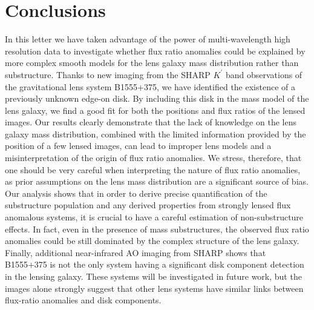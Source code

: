 \documentclass[useAMS,usenatbib]{mn2e}
\begin{document}
\section{Conclusions}
In this letter we have taken advantage of the power of
multi-wavelength high resolution data to investigate whether flux
ratio anomalies could be explained by more complex smooth models for
the lens galaxy mass distribution rather than substructure. Thanks to
new imaging from the SHARP $K^{\prime}$ band observations of the
gravitational lens system B1555+375, we have identified the existence
of a previously unknown edge-on disk. By including this disk in the
mass model of the lens galaxy, we find a good fit for both the
positions and flux ratios of the lensed images. Our results clearly
demonstrate that the lack of knowledge on the lens galaxy mass
distribution, combined with the limited information provided by the
position of a few lensed images, can lead to improper lens models and
a misinterpretation of the origin of flux ratio anomalies.  We stress,
therefore, that one should be very careful when interpreting the
nature of flux ratio anomalies, as prior assumptions on the lens mass
distribution are a significant source of bias. Our analysis shows that
in order to derive precise quantification of the substructure
population and any derived properties from strongly lensed flux
anomalous systems, it is crucial to have a careful estimation of
non-substructure effects. In fact, even in the presence of mass
substructures, the observed flux ratio anomalies could be still
dominated by the complex structure of the lens galaxy. Finally,
additional near-infrared AO imaging from SHARP shows that B1555+375 is
not the only system having a significant disk component detection in
the lensing galaxy.  These systems will be investigated in future
work, but the images alone strongly suggest that other lens systems
have similar links between flux-ratio anomalies and disk components.
\end{document}
